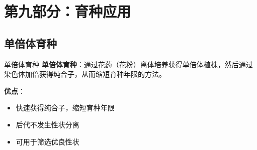 \documentclass[a4paper,11pt]{ctexart}
\begin{document}

\section{第九部分：育种应用}

\subsection{单倍体育种}

\begin{definitionbox}{单倍体育种}
\textbf{单倍体育种}：通过花药（花粉）离体培养获得单倍体植株，然后通过染色体加倍获得纯合子，从而缩短育种年限的方法。

\textbf{优点}：
\begin{itemize}[leftmargin=2em]
    \item 快速获得纯合子，缩短育种年限
    \item 后代不发生性状分离
    \item 可用于筛选优良性状
\end{itemize}
\end{definitionbox}
\end{document}
